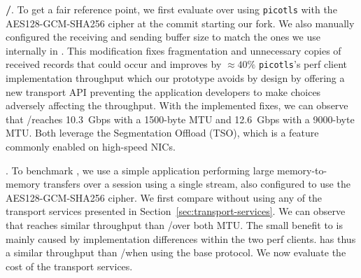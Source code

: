 \textbf{\tcp/\tls}. To get a fair reference point, we first evaluate \tls over 
\tcp using \texttt{picotls} with the AES128-GCM-SHA256 cipher at the commit 
starting our fork. We also manually configured the receiving and sending buffer size 
to match the ones we use internally in \tcpls. This modification fixes fragmentation and 
unnecessary copies of received \tls records that could occur and improves by
$\approx 40\%$ \texttt{picotls}'s perf client
implementation throughput which our \tcpls 
prototype avoids by design by offering a new transport API preventing the
application developers to make choices adversely affecting the throughput. With
the implemented fixes, we can observe that \tcp/\tls reaches 10.3~Gbps 
with a 1500-byte MTU and 12.6~Gbps with a 9000-byte MTU. Both leverage the 
\tcp Segmentation Offload (TSO), which is a feature commonly enabled on 
high-speed NICs.

\textbf{\tcpls}.
To benchmark \tcpls, we use a simple application performing large 
memory-to-memory transfers over a \tcpls session using a single stream, also
configured to use the AES128-GCM-SHA256 cipher. 
We first compare \tcpls without using any of the transport services 
presented in Section~\ref{sec:transport-services}. We can observe that 
\tcpls reaches similar throughput than \tls/\tcp over both 
MTU. The small benefit to \tcpls is mainly caused by implementation differences
within the two perf clients. \tcpls has thus a similar throughput than \tcp/\tls when using the base 
protocol. We now evaluate the cost of the transport services.


